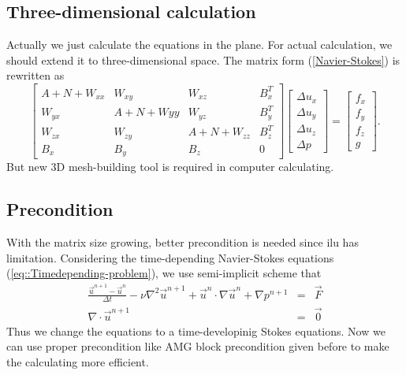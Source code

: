 \documentclass[a4paper]{article}
\begin{document}
\subsection{Three-dimensional calculation}
Actually we just calculate the equations in the plane. For actual calculation, we should extend it to three-dimensional space. The matrix form (\ref{Navier-Stokes}) is rewritten as
\begin{equation}
\left[ \begin{array}{cccc}
A + N +W_{xx} & W_{xy} & W_{xz} & B_x^T \\
W_{yx} & A +N +W{yy}& W_{yz} & B_y^T \\
W_{zx} & W_{zy}  &A + N + W_{zz} & B_z^T \\
B_x & B_y &B_z& 0
\end{array}
\right]
\left[\begin{array}{cccc}
\Delta u_x\\
\Delta u_y\\
\Delta u_z\\
\Delta p
\end{array}
\right]=
\left[\begin{array}{cccc}
f_x\\
f_y\\
f_z\\
g
\end{array}
\right].
\label{3D-Navier-Stokes}
\end{equation}
But new 3D mesh-building tool is required in computer calculating.
\subsection{Precondition}
With the matrix size growing, better precondition is needed since ilu has limitation. Considering the time-depending Navier-Stokes equations (\ref{eq::Timedepending-problem}), we use semi-implicit scheme that
\begin{equation}
\begin{array}{rcl}
\frac{\vec{u}^{n+1}-\vec{u}^n}{\Delta t} - \nu \nabla^2 \vec{u}^{n+1} + \vec{u}^{n}\cdot \nabla \vec{u}^n + \nabla p^{n+1} &=& \vec{F} \\
\nabla \cdot \vec{u}^{n+1} &=& \vec{0}
\label{eq::implicit and explicit}
\end{array}
\end{equation}
Thus we change the equations to a time-developinig Stokes equations. Now we can use proper precondition like AMG block precondition given before to make the calculating more efficient.



\end{document}
